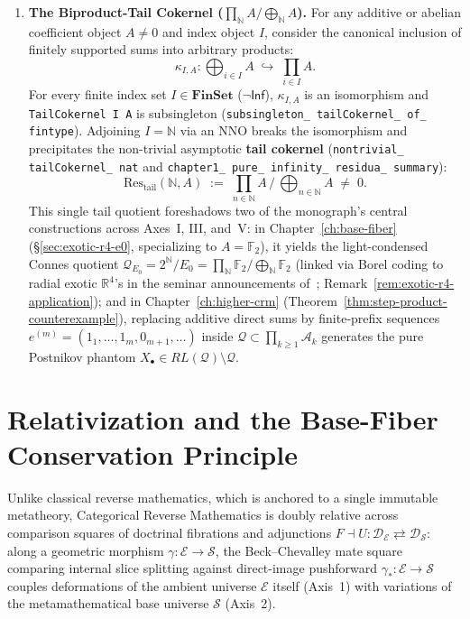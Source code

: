 \begin{enumerate}
  \item \textbf{The Biproduct-Tail Cokernel ($\prod_{\mathbb{N}} A / \bigoplus_{\mathbb{N}} A$).} For any additive or abelian coefficient object $A \neq 0$ and index object $I$, consider the canonical inclusion of finitely supported sums into arbitrary products:
  \[
    \kappa_{I, A} : \bigoplus_{i \in I} A \;\hookrightarrow\; \prod_{i \in I} A.
  \]
  For every finite index set $I \in \mathbf{FinSet}$ ($\neg\mathsf{Inf}$), $\kappa_{I, A}$ is an isomorphism and \texttt{TailCokernel I A} is subsingleton (\texttt{subsingleton\_ tailCokernel\_ of\_ fintype}). Adjoining $I = \mathbb{N}$ via an $\mathrm{NNO}$ breaks the isomorphism and precipitates the non-trivial asymptotic \textbf{tail cokernel} (\texttt{nontrivial\_ tailCokernel\_ nat} and \texttt{chapter1\_ pure\_ infinity\_ residua\_ summary}):
  \[
    \mathrm{Res}_{\mathrm{tail}}(\mathbb{N}, A) \;:=\; \prod_{n \in \mathbb{N}} A \,\Big/\, \bigoplus_{n \in \mathbb{N}} A \;\neq\; 0.
  \]
  This single tail quotient foreshadows two of the monograph's central constructions across Axes~I, III, and~V: in Chapter~\ref{ch:base-fiber} (\S\ref{sec:exotic-r4-e0}, specializing to $A = \mathbb{F}_2$), it yields the light-condensed Connes quotient $\mathcal{Q}_{E_0} = 2^{\mathbb{N}}/E_0 = \prod_{\mathbb{N}} \mathbb{F}_2 / \bigoplus_{\mathbb{N}} \mathbb{F}_2$ (linked via Borel coding to radial exotic $\mathbb{R}^4$'s in the seminar announcements of~\cite{GompfPanagiotopoulos26}; Remark~\ref{rem:exotic-r4-application}); and in Chapter~\ref{ch:higher-crm} (Theorem~\ref{thm:step-product-counterexample}), replacing additive direct sums by finite-prefix sequences $e^{(m)} = (1_1, \dots, 1_m, 0_{m+1}, \dots)$ inside $\mathcal{Q} \subset \prod_{k \ge 1} \mathcal{A}_k$ generates the pure Postnikov phantom $X_\bullet \in RL(\mathcal{Q}) \setminus \mathcal{Q}$.

\end{enumerate}

\section{Relativization and the Base-Fiber Conservation Principle}\label{sec:base-fiber}

Unlike classical reverse mathematics, which is anchored to a single immutable metatheory, Categorical Reverse Mathematics is doubly relative across comparison squares of doctrinal fibrations and adjunctions $F \dashv U : \mathcal{D}_{\mathcal{E}} \rightleftarrows \mathcal{D}_{\mathcal{S}}$: along a geometric morphism $\gamma : \mathcal{E} \to \mathcal{S}$, the Beck--Chevalley mate square comparing internal slice splitting against direct-image pushforward $\gamma_* : \mathcal{E} \to \mathcal{S}$ couples deformations of the ambient universe $\mathcal{E}$ itself (Axis~1) with variations of the metamathematical base universe $\mathcal{S}$ (Axis~2).

